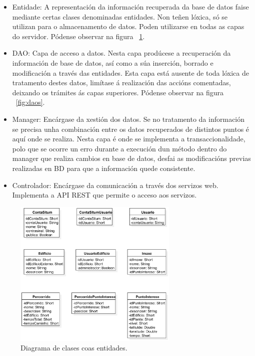 \begin{itemize}
	\item Entidade: A representación da información recuperada da base de datos faise mediante certas clases denominadas entidades. Non teñen lóxica, só se utilizan para o almacenamento de datos. Poden utilizarse en todas as capas do servidor. Pódense observar na figura ~\ref{fig:entidades}.
	\item DAO: Capa de acceso a datos. Nesta capa prodúcese a recuperación da información de base de datos, así como a súa inserción, borrado e modificación a través das entidades. Esta capa está ausente de toda lóxica de tratamento destes datos, limítase á realización das accións comentadas, deixando os trámites ás capas superiores. Pódense observar na figura ~\ref{fig:daos}.
	\item Manager: Encárgase da xestión dos datos. Se no tratamento da información se precisa unha combinación entre os datos recuperados de distintos puntos é aquí onde se realiza. Nesta capa é onde se implementa a transaccionalidade, polo que se ocorre un erro durante a execución dun método dentro do manager que realiza cambios en base de datos, desfai as modificacións previas realizadas en BD para que a información quede consistente.
	\item Controlador: Encárgase da comunicación a través dos servizos web. Implementa a API REST que permite o acceso aos servizos.
\end{itemize}

\begin{figure}[tbh] 
	\begin{center}
		\includegraphics[width=0.70\textwidth]{figures/Clases/diagramaEntidades}
		\caption{Diagrama de clases coas entidades.}
		\label{fig:entidades}
	\end{center}
\end{figure}

